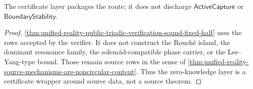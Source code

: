 \begin{corollary}
\label{cor:unified-reality-zero-knowledge-layer-does-not-create-witness}
The certificate layer packages the route; it does not discharge
$\mathsf{ActiveCapture}$ or $\mathsf{BoundaryStability}$.
\end{corollary}

\begin{proof}
\autoref{thm:unified-reality-public-triadic-verification-sound-fixed-half}
uses the rows accepted by the verifier.  It does not construct the
Rouch\'e island, the dominant resonance family, the solenoid-compatible
phase carrier, or the Lee--Yang-type bound.  Those remain source rows in
the sense of
\autoref{thm:unified-reality-source-mechanisms-are-noncircular-content}.
Thus the zero-knowledge layer is a certificate wrapper around source
data, not a source theorem.
\end{proof}
